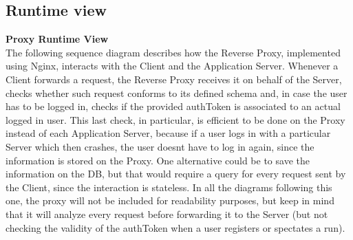 \documentclass[titlepage]{article}
\begin{document}
	\pagebreak
	
	\subsection{Runtime view}
	
	{\bf Proxy Runtime View }\\ 
	The following sequence diagram describes how the Reverse Proxy, implemented using Nginx, interacts with the Client and the Application Server.
	Whenever a Client forwards a request, the Reverse Proxy receives it on behalf of the Server, checks whether such request conforms to its defined schema and, in case the user has to be logged in, checks if the provided authToken is associated to an actual logged in user. This last check, in particular, is efficient to be done on the Proxy instead of each Application Server, because if a user logs in with a particular Server which then crashes, the user doesn\textsc{}t have to log in again, since the information is stored on the Proxy. One alternative could be to save the information on the DB, but that would require a query for every request sent by the Client, since the interaction is stateless.
	In all the diagrams following this one, the proxy will not be included for readability purposes, but keep in mind that it will analyze every request before forwarding it to the Server (but not checking the validity of the authToken when a user registers or spectates a run).
	
\end{document}
